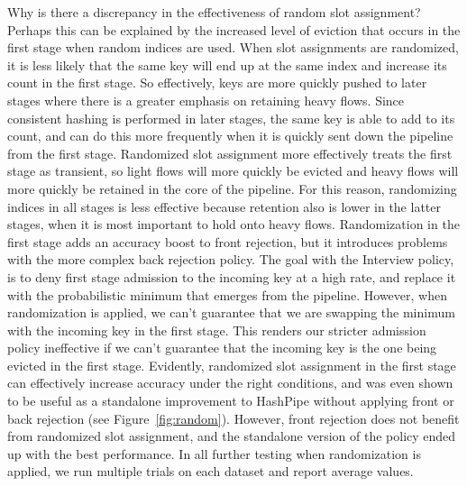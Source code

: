 Why is there a discrepancy in the effectiveness of random slot assignment? Perhaps this can be explained by the increased level of eviction that occurs in the first stage when random indices are used. When slot assignments are randomized, it is less likely that the same key will end up at the same index and increase its count in the first stage. So effectively, keys are more quickly pushed to later stages where there is a greater emphasis on retaining heavy flows. Since consistent hashing is performed in later stages, the same key is able to add to its count, and can do this more frequently when it is quickly sent down the pipeline from the first stage. Randomized slot assignment more effectively treats the first stage as transient, so light flows will more quickly be evicted and heavy flows will more quickly be retained in the core of the pipeline. For this reason, randomizing indices in all stages is less effective because retention also is lower in the latter stages, when it is most important to hold onto heavy flows. Randomization in the first stage adds an accuracy boost to front rejection, but it introduces problems with the more complex back rejection policy. The goal with the Interview policy, is to deny first stage admission to the incoming key at a high rate, and replace it with the probabilistic minimum that emerges from the pipeline. However, when randomization is applied, we can't guarantee that we are swapping the minimum with the incoming key in the first stage. This renders our stricter admission policy ineffective if we can't guarantee that the incoming key is the one being evicted in the first stage. Evidently, randomized slot assignment in the first stage can effectively increase accuracy under the right conditions, and was even shown to be useful as a standalone improvement to HashPipe without applying front or back rejection (see Figure~\ref{fig:random}). However, front rejection does not benefit from randomized slot assignment, and the standalone version of the policy ended up with the best performance. In all further testing when randomization is applied, we run multiple trials on each dataset and report average values.
